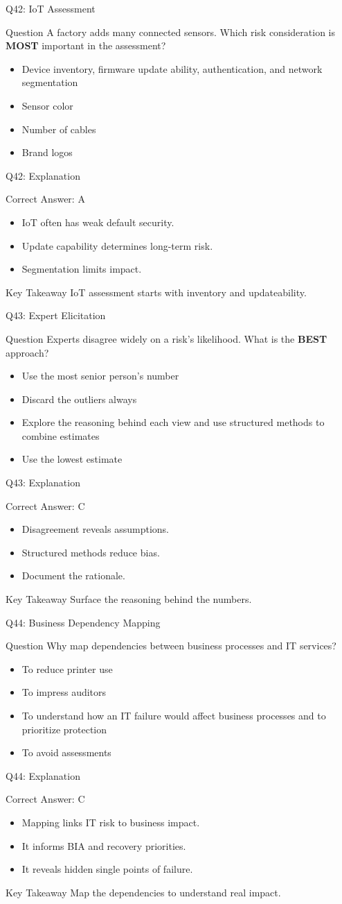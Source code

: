 \documentclass[aspectratio=169]{beamer}
\newcommand{\hq}[7]{%
	\begin{frame}{Q#1: #2}
		\begin{block}{Question}
			#3
		\end{block}
		\begin{itemize}
			#4
		\end{itemize}
	\end{frame}
	\begin{frame}{Q#1: Explanation}
		\begin{block}{Correct Answer: #5}
			\begin{itemize}
				#6
			\end{itemize}
		\end{block}
		\begin{alertblock}{Key Takeaway}
			#7
		\end{alertblock}
	\end{frame}
}
\begin{document}
	\hq{42}{IoT Assessment}
	{A factory adds many connected sensors. Which risk consideration is \textbf{MOST} important in the assessment?}
	{\item[\textbf{(A)}] Device inventory, firmware update ability, authentication, and network segmentation
		\item[\textbf{(B)}] Sensor color
		\item[\textbf{(C)}] Number of cables
		\item[\textbf{(D)}] Brand logos}
	{A}
	{\item IoT often has weak default security.
		\item Update capability determines long-term risk.
		\item Segmentation limits impact.}
	{IoT assessment starts with inventory and updateability.}
	
	\hq{43}{Expert Elicitation}
	{Experts disagree widely on a risk's likelihood. What is the \textbf{BEST} approach?}
	{\item[\textbf{(A)}] Use the most senior person's number
		\item[\textbf{(B)}] Discard the outliers always
		\item[\textbf{(C)}] Explore the reasoning behind each view and use structured methods to combine estimates
		\item[\textbf{(D)}] Use the lowest estimate}
	{C}
	{\item Disagreement reveals assumptions.
		\item Structured methods reduce bias.
		\item Document the rationale.}
	{Surface the reasoning behind the numbers.}
	
	\hq{44}{Business Dependency Mapping}
	{Why map dependencies between business processes and IT services?}
	{\item[\textbf{(A)}] To reduce printer use
		\item[\textbf{(B)}] To impress auditors
		\item[\textbf{(C)}] To understand how an IT failure would affect business processes and to prioritize protection
		\item[\textbf{(D)}] To avoid assessments}
	{C}
	{\item Mapping links IT risk to business impact.
		\item It informs BIA and recovery priorities.
		\item It reveals hidden single points of failure.}
	{Map the dependencies to understand real impact.}
	
\end{document}
